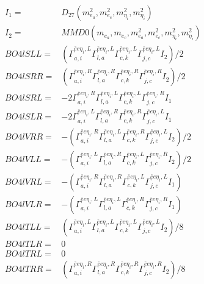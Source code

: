 \documentclass[A4,landscape]{article}
\begin{document}
\begin{align} 
I_1 = & D_{27}(m^2_{e_{{a}}}, m^2_{e_{{c}}}, m^2_{\eta_i}, m^2_{\eta_i}) \\ 
I_2 = & MMD0(m_{e_{{a}}}, m_{e_{{c}}}, m^2_{e_{{a}}}, m^2_{e_{{c}}}, m^2_{\eta_i}, m^2_{\eta_i}) \\ 
  BO4lSLL= & ( \Gamma^{\bar{e}e \eta_i ,L}_{a, i} \Gamma^{\bar{e}e \eta_i ,L}_{l, a} \Gamma^{\bar{e}e \eta_i ,L}_{c, k} \Gamma^{\bar{e}e \eta_i ,L}_{j, c} I_2)/2 \\ 
  BO4lSRR= & ( \Gamma^{\bar{e}e \eta_i ,R}_{a, i} \Gamma^{\bar{e}e \eta_i ,R}_{l, a} \Gamma^{\bar{e}e \eta_i ,R}_{c, k} \Gamma^{\bar{e}e \eta_i ,R}_{j, c} I_2)/2 \\ 
  BO4lSRL= & -2  \Gamma^{\bar{e}e \eta_i ,R}_{a, i} \Gamma^{\bar{e}e \eta_i ,L}_{l, a} \Gamma^{\bar{e}e \eta_i ,L}_{c, k} \Gamma^{\bar{e}e \eta_i ,R}_{j, c} I_1 \\ 
  BO4lSLR= & -2  \Gamma^{\bar{e}e \eta_i ,L}_{a, i} \Gamma^{\bar{e}e \eta_i ,R}_{l, a} \Gamma^{\bar{e}e \eta_i ,R}_{c, k} \Gamma^{\bar{e}e \eta_i ,L}_{j, c} I_1 \\ 
  BO4lVRR= & -( \Gamma^{\bar{e}e \eta_i ,R}_{a, i} \Gamma^{\bar{e}e \eta_i ,L}_{l, a} \Gamma^{\bar{e}e \eta_i ,R}_{c, k} \Gamma^{\bar{e}e \eta_i ,L}_{j, c} I_2)/2 \\ 
  BO4lVLL= & -( \Gamma^{\bar{e}e \eta_i ,L}_{a, i} \Gamma^{\bar{e}e \eta_i ,R}_{l, a} \Gamma^{\bar{e}e \eta_i ,L}_{c, k} \Gamma^{\bar{e}e \eta_i ,R}_{j, c} I_2)/2 \\ 
  BO4lVRL= & -( \Gamma^{\bar{e}e \eta_i ,R}_{a, i} \Gamma^{\bar{e}e \eta_i ,R}_{l, a} \Gamma^{\bar{e}e \eta_i ,L}_{c, k} \Gamma^{\bar{e}e \eta_i ,L}_{j, c} I_1) \\ 
  BO4lVLR= & -( \Gamma^{\bar{e}e \eta_i ,L}_{a, i} \Gamma^{\bar{e}e \eta_i ,L}_{l, a} \Gamma^{\bar{e}e \eta_i ,R}_{c, k} \Gamma^{\bar{e}e \eta_i ,R}_{j, c} I_1) \\ 
  BO4lTLL= & ( \Gamma^{\bar{e}e \eta_i ,L}_{a, i} \Gamma^{\bar{e}e \eta_i ,L}_{l, a} \Gamma^{\bar{e}e \eta_i ,L}_{c, k} \Gamma^{\bar{e}e \eta_i ,L}_{j, c} I_2)/8 \\ 
  BO4lTLR= & 0 \\ 
  BO4lTRL= & 0 \\ 
  BO4lTRR= & ( \Gamma^{\bar{e}e \eta_i ,R}_{a, i} \Gamma^{\bar{e}e \eta_i ,R}_{l, a} \Gamma^{\bar{e}e \eta_i ,R}_{c, k} \Gamma^{\bar{e}e \eta_i ,R}_{j, c} I_2)/8 \\ 
\end{align} 
\end{document}
